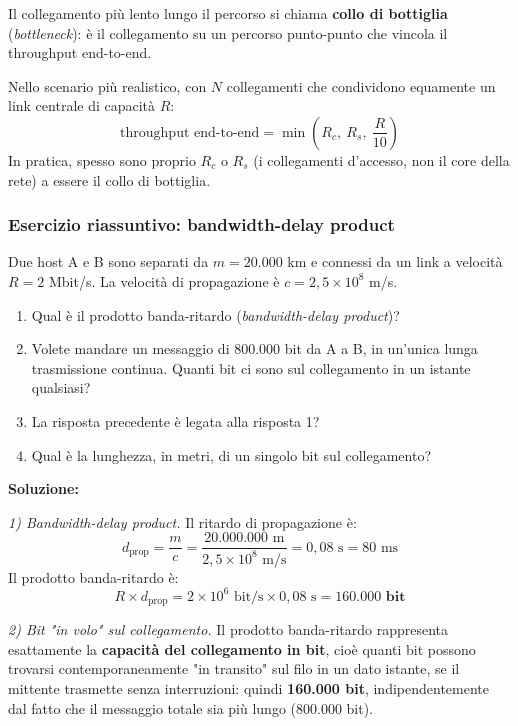 \documentclass[12pt, a4paper]{article}
\begin{document}
Il collegamento più lento lungo il percorso si chiama \textbf{collo di bottiglia} (\textit{bottleneck}): è il collegamento su un percorso punto-punto che vincola il throughput end-to-end.

Nello scenario più realistico, con $N$ collegamenti che condividono equamente un link centrale di capacità $R$:
$$\text{throughput end-to-end} = \min\left(R_c,\ R_s,\ \frac{R}{10}\right)$$
In pratica, spesso sono proprio $R_c$ o $R_s$ (i collegamenti d'accesso, non il core della rete) a essere il collo di bottiglia.

\subsubsection{Esercizio riassuntivo: bandwidth-delay product}

\begin{tcolorbox}[colback=orange!5, colframe=orange!70!black, title=\textbf{Esercizio 1.6 (P.25, Cap.\ 1 Kurose-Ross)}]
Due host A e B sono separati da $m = 20.000$ km e connessi da un link a velocità $R = 2$ Mbit/s. La velocità di propagazione è $c = 2{,}5 \times 10^8$ m/s.

\begin{enumerate}
    \item Qual è il prodotto banda-ritardo (\textit{bandwidth-delay product})?
    \item Volete mandare un messaggio di 800.000 bit da A a B, in un'unica lunga trasmissione continua. Quanti bit ci sono sul collegamento in un istante qualsiasi?
    \item La risposta precedente è legata alla risposta 1?
    \item Qual è la lunghezza, in metri, di un singolo bit sul collegamento?
\end{enumerate}

\textbf{Soluzione:}

\textit{1) Bandwidth-delay product.} Il ritardo di propagazione è:
$$d_{\text{prop}} = \frac{m}{c} = \frac{20.000.000 \text{ m}}{2{,}5\times10^8 \text{ m/s}} = 0{,}08 \text{ s} = 80 \text{ ms}$$
Il prodotto banda-ritardo è:
$$R \times d_{\text{prop}} = 2\times10^6 \text{ bit/s} \times 0{,}08 \text{ s} = \mathbf{160.000 \text{ bit}}$$

\textit{2) Bit "in volo" sul collegamento.} Il prodotto banda-ritardo rappresenta esattamente la \textbf{capacità del collegamento in bit}, cioè quanti bit possono trovarsi contemporaneamente "in transito" sul filo in un dato istante, se il mittente trasmette senza interruzioni: quindi \textbf{160.000 bit}, indipendentemente dal fatto che il messaggio totale sia più lungo (800.000 bit).


\end{tcolorbox}
\end{document}
